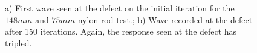   \begin{figure}
 \begin{subfigmatrix}{2}
 \end{subfigmatrix}

    \caption
    { \label{fig:nylonExp2}
    a) First wave seen at the defect on the initial iteration for the $148 mm$ and $75 mm$ nylon rod test.; b) Wave recorded at the defect after 150 iterations. Again, the response seen at the defect has tripled.
  }
 \end{figure}
 

